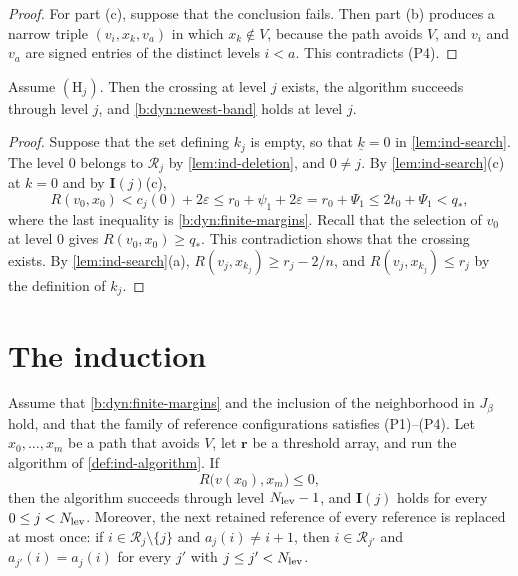 \begin{proof}
For part (c), suppose that the conclusion fails. Then part (b) produces a narrow triple $(v_i,x_k,v_a)$ in which $x_k\notin V$, because the path avoids $V$, and $v_i$ and $v_a$ are signed entries of the distinct levels $i<a$. This contradicts (P4).
\end{proof}

\begin{lemma}\label{lem:ind-crossing}
Assume $(\mathrm H_j)$. Then the crossing at level $j$ exists, the algorithm succeeds through level $j$, and \eqref{b:dyn:newest-band} holds at level $j$.
\end{lemma}

\begin{proof}
Suppose that the set defining $k_j$ is empty, so that $\underline k=0$ in \cref{lem:ind-search}. The level $0$ belongs to $\mathcal R_j$ by \cref{lem:ind-deletion}, and $0\neq j$. By \cref{lem:ind-search}(c) at $k=0$ and by $\mathbf I(j)$(c),
\[
 R(v_0,x_0)<c_j(0)+2\varepsilon\le r_0+\psi_1+2\varepsilon=r_0+\Psi_1\le2t_0+\Psi_1<q_*,
\]
where the last inequality is \eqref{b:dyn:finite-margins}. Recall that the selection of $v_0$ at level $0$ gives $R(v_0,x_0)\ge q_*$. This contradiction shows that the crossing exists. By \cref{lem:ind-search}(a), $R(v_j,x_{k_j})\ge r_j-2/n$, and $R(v_j,x_{k_j})\le r_j$ by the definition of $k_j$.
\end{proof}

\section{The induction}\label{sec:ind-induction}

\begin{proposition}\label{prop:ind-induction}
Assume that \eqref{b:dyn:finite-margins} and the inclusion of the neighborhood in $J_\beta$ hold, and that the family of reference configurations satisfies (P1)--(P4). Let $x_0,\dots,x_m$ be a path that avoids $V$, let $\mathbf r$ be a threshold array, and run the algorithm of \cref{def:ind-algorithm}. If
\[
 R\bigl(v(x_0),x_m\bigr)\le0,
\]
then the algorithm succeeds through level $N_{\rm lev}-1$, and $\mathbf I(j)$ holds for every $0\le j<N_{\rm lev}$. Moreover, the next retained reference of every reference is replaced at most once: if $i\in\mathcal R_j\setminus\{j\}$ and $a_j(i)\neq i+1$, then $i\in\mathcal R_{j'}$ and $a_{j'}(i)=a_j(i)$ for every $j'$ with $j\le j'<N_{\rm lev}$.
\end{proposition}

